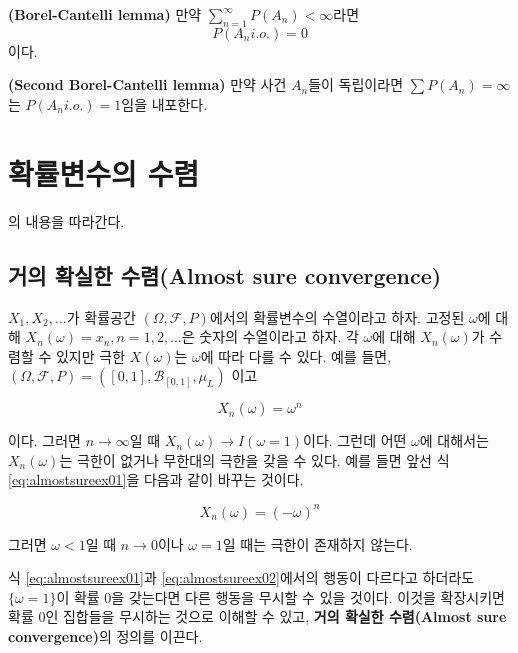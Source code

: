 \documentclass[b5paper,]{scrbook}
\theoremstyle{plain}
\theoremstyle{definition}
\numberwithin{equation}{section}
\let\BeginKnitrBlock\begin \let\EndKnitrBlock\end
\begin{document}
\BeginKnitrBlock{lemma}[보렐-칸텔리 따름정리]
\protect\hypertarget{lem:unnamed-chunk-59}{}{\label{lem:unnamed-chunk-59}
{} }\textbf{(Borel-Cantelli lemma)}
만약 \(\sum_{n=1}^{\infty}P(A_{n}) < \infty\)라면 \[P(A_{n} i.o.)=0\]
이다.
\EndKnitrBlock{lemma}

\BeginKnitrBlock{lemma}[제 2 보렐-칸텔리 따름정리]
\protect\hypertarget{lem:unnamed-chunk-60}{}{\label{lem:unnamed-chunk-60}
{} }\textbf{(Second
Borel-Cantelli lemma)} 만약 사건 \(A_{n}\)들이 독립이라면
\(\sum P(A_{n})=\infty\)는 \(P(A_{n} i.o.)=1\)임을 내포한다.
\EndKnitrBlock{lemma}

\chapter{확률변수의 수렴}\label{convergencerv}

\citep{Proschan2016}의 내용을 따라간다.

\section{거의 확실한 수렴(Almost sure
convergence)}\label{--almost-sure-convergence}

\(X_{1}, X_{2},\ldots\)가 확률공간 \((\Omega, \mathcal{F}, P)\)에서의
확률변수의 수열이라고 하자. 고정된 \(\omega\)에 대해
\(X_{n}(\omega)=x_{n}, n=1,2,\ldots\)은 숫자의 수열이라고 하자. 각
\(\omega\)에 대해 \(X_{n}(\omega)\)가 수렴할 수 있지만 극한
\(X(\omega)\)는 \(\omega\)에 따라 다를 수 있다. 예를 들면,
\((\Omega, \mathcal{F}, P)=([0,1],\mathcal{B}_{[0,1]},\mu_{L})\) 이고

\begin{equation}
X_{n}(\omega)=\omega^{n}
\label{eq:almostsureex01}
\end{equation}

이다. 그러면 \(n\rightarrow \infty\)일 때
\(X_{n}(\omega) \rightarrow I(\omega=1)\)이다. 그런데 어떤 \(\omega\)에
대해서는 \(X_{n}(\omega)\)는 극한이 없거나 무한대의 극한을 갖을 수 있다.
예를 들면 앞선 식 \eqref{eq:almostsureex01}을 다음과 같이 바꾸는 것이다.

\begin{equation}
X_{n}(\omega)=(-\omega)^{n}
\label{eq:almostsureex02}
\end{equation}

그러면 \(\omega < 1\)일 때 \(n\rightarrow 0\)이나 \(\omega=1\)일 때는
극한이 존재하지 않는다.

식 \eqref{eq:almostsureex01}과 \eqref{eq:almostsureex02}에서의 행동이
다르다고 하더라도 \(\{\omega=1\}\)이 확률 0을 갖는다면 다른 행동을
무시할 수 있을 것이다. 이것을 확장시키면 확률 0인 집합들을 무시하는
것으로 이해할 수 있고, \textbf{거의 확실한 수렴(Almost sure
convergence)}의 정의를 이끈다.
\end{document}
